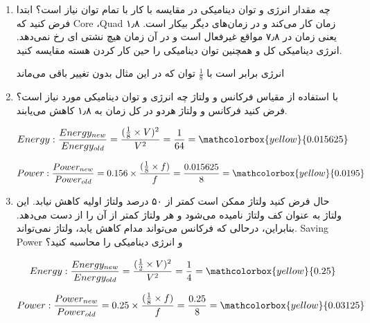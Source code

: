 \begin{enumerate}
	\item چه مقدار انرژی و توان دینامیکی در مقایسه با کار با تمام توان نیاز است؟ ابتدا فرض کنید که Core ،Quad ۱٫۸ زمان کار می‌کند و در زمان‌های دیگر بیکار است. یعنی زمان در ۷٫۸ مواقع غیرفعال است و در آن زمان هیچ نشتی ای رخ نمی‌دهد. انرژی دینامیکی کل و همچنین توان دینامیکی را حین کار کردن هسته مقایسه کنید.
	
	\begin{qsolve}
		انرژی برابر است با $\frac{1}{8}$ توان که در این مثال بدون تغییر باقی می‌ماند
	\end{qsolve}
	
	
	
	
	
	
	
	\item با استفاده از مقیاس فرکانس و ولتاژ چه انرژی و توان دینامیکی مورد نیاز است؟ فرض کنید فرکانس و ولتاژ هردو در کل زمان به ۱٫۸ کاهش می‌یابند.
	
	\begin{qsolve}
		\begin{equation}
			Energy: \frac{Energy_{new}}{Energy_{old}} = \frac{(\frac{1}{8} \times V)^2}{V^2} = \frac{1}{64} = \mathcolorbox{yellow}{0.015625}
		\end{equation}
		
		\begin{equation}
			Power: \frac{Power_{new}}{Power_{old}} = 0.156 \times \frac{(\frac{1}{8} \times f)}{f} = \frac{0.015625}{8} = \mathcolorbox{yellow}{0.0195}
		\end{equation}
	\end{qsolve}
	
	
	
	
	
	
	
	
	\item حال فرض کنید ولتاژ ممکن است کمتر از ۵۰ درصد ولتاژ اولیه کاهش نیابد. این ولتاژ به عنوان کف ولتاژ نامیده می‌شود و هر ولتاژ کمتر از آن را از دست می‌دهد. بنابراین، درحالی که فرکانس می‌تواند مدام کاهش یابد، ولتاژ نمی‌تواند. Saving Power و انرژی دینامیکی را محاسبه کنید؟
	
	\begin{qsolve}
		\begin{equation}
			Energy: \frac{Energy_{new}}{Energy_{old}} = \frac{(\frac{1}{2} \times 	V)^2}{V^2} = \frac{1}{4} = \mathcolorbox{yellow}{0.25}
		\end{equation}
		
		\begin{equation}
			Power: \frac{Power_{new}}{Power_{old}} = 0.25 \times \frac{(\frac{1}{8} \times 	f)}{f} = \frac{0.25}{8} = \mathcolorbox{yellow}{0.03125}
		\end{equation}
	\end{qsolve}
	

\end{enumerate}
